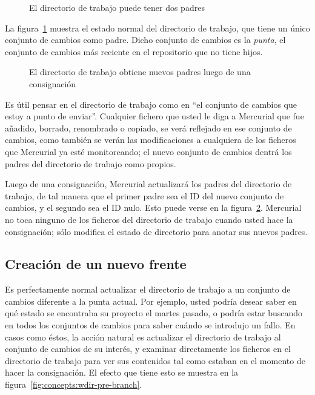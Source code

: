 \begin{figure}[ht]
  \centering
  \caption{El directorio de trabajo puede tener dos padres}
  \label{fig:concepts:wdir}
\end{figure}

La figura~\ref{fig:concepts:wdir} muestra el estado normal del
directorio de trabajo, que tiene un único conjunto de cambios como
padre. Dicho conjunto de cambios es la \emph{punta}, el conjunto de
cambios más reciente en el repositorio que no tiene hijos.

\begin{figure}[ht]
  \centering
  \caption{El directorio de trabajo obtiene nuevos padres luego de una
  consignación}
  \label{fig:concepts:wdir-after-commit}
\end{figure}

Es útil pensar en el directorio de trabajo como en ``el conjunto de
cambios que estoy a punto de enviar''. Cualquier fichero que usted le
diga a Mercurial que fue añadido, borrado, renombrado o copiado, se
verá reflejado en ese conjunto de cambios, como también se verán las
modificaciones a cualquiera de los ficheros que Mercurial ya esté
monitoreando; el nuevo conjunto de cambios dentrá los padres del
directorio de trabajo como propios.

Luego de una consignación, Mercurial actualizará los padres del
directorio de trabajo, de tal manera que el primer padre sea el ID del
nuevo conjunto de cambios, y el segundo sea el ID nulo. Esto puede
verse en la figura~\ref{fig:concepts:wdir-after-commit}.  Mercurial no
toca ninguno de los ficheros del directorio de trabajo cuando usted
hace la consignación; sólo modifica el estado de directorio para
anotar sus nuevos padres.

\subsection{Creación de un nuevo frente}

Es perfectamente normal actualizar el directorio de trabajo a un
conjunto de cambios diferente a la punta actual. Por ejemplo, usted
podría desear saber en qué estado se encontraba su proyecto el martes
pasado, o podría estar buscando en todos los conjuntos de cambios para
saber cuándo se introdujo un fallo. En casos como éstos, la acción
natural es actualizar el directorio de trabajo al conjunto de cambios
de su interés, y examinar directamente los ficheros en el directorio
de trabajo para ver sus contenidos tal como estaban en el momento de
hacer la consignación. El efecto que tiene esto se muestra en la
figura~\ref{fig:concepts:wdir-pre-branch}.

